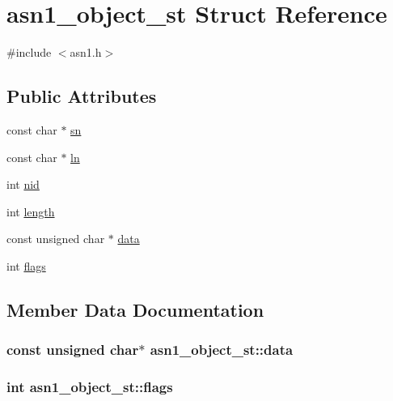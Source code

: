 \hypertarget{structasn1__object__st}{}\section{asn1\+\_\+object\+\_\+st Struct Reference}
\label{structasn1__object__st}


{\ttfamily \#include $<$asn1.\+h$>$}

\subsection*{Public Attributes}
\begin{DoxyCompactItemize}
\item 
const char $\ast$ \hyperlink{structasn1__object__st_a354a9532f5135bf342293f28af850177}{sn}
\item 
const char $\ast$ \hyperlink{structasn1__object__st_a02d44fa6f642b789372cf8f57f7f0f12}{ln}
\item 
int \hyperlink{structasn1__object__st_a1506f26770df5e823c217dea262bd64f}{nid}
\item 
int \hyperlink{structasn1__object__st_aebd85f3c9bec7ccf21ce77aa71c78ce1}{length}
\item 
const unsigned char $\ast$ \hyperlink{structasn1__object__st_a076f159c5190422adbe799dc10aa8ebe}{data}
\item 
int \hyperlink{structasn1__object__st_adfe42f89b19fcc6da297e98a54c57ac6}{flags}
\end{DoxyCompactItemize}


\subsection{Member Data Documentation}
\subsubsection[{\texorpdfstring{data}{data}}]{\setlength{\rightskip}{0pt plus 5cm}const unsigned char$\ast$ asn1\+\_\+object\+\_\+st\+::data}\hypertarget{structasn1__object__st_a076f159c5190422adbe799dc10aa8ebe}{}\label{structasn1__object__st_a076f159c5190422adbe799dc10aa8ebe}
\subsubsection[{\texorpdfstring{flags}{flags}}]{\setlength{\rightskip}{0pt plus 5cm}int asn1\+\_\+object\+\_\+st\+::flags}\hypertarget{structasn1__object__st_adfe42f89b19fcc6da297e98a54c57ac6}{}\label{structasn1__object__st_adfe42f89b19fcc6da297e98a54c57ac6}
